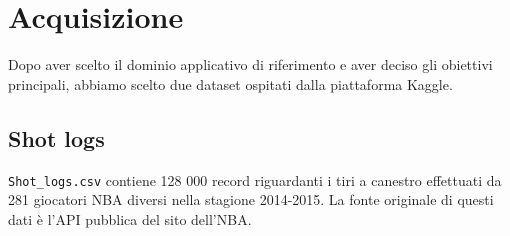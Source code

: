 \section{Acquisizione}

Dopo aver scelto il dominio applicativo di riferimento e aver deciso gli obiettivi principali, abbiamo scelto due dataset ospitati dalla piattaforma Kaggle.

\subsection{Shot logs}


\texttt{Shot\_logs.csv}\cite{shot_logs} contiene 128 000 record riguardanti i tiri a canestro effettuati da 281 giocatori NBA diversi nella stagione 2014-2015. La fonte originale di questi dati è l'API pubblica del sito dell'NBA.
